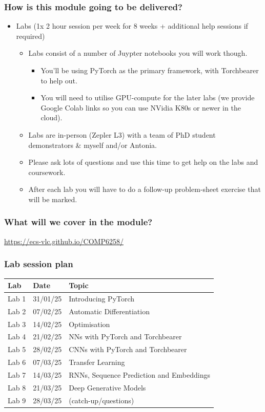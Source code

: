 \documentclass[]{article}
\begin{document}
\begin{frame}
	\frametitle{How is this module going to be delivered?}

	\begin{itemize}
		\item<+-> Labs (1x 2 hour session per week for 8 weeks + additional help sessions if required)
		\begin{itemize}
			\item Labs consist of a number of Juypter notebooks you will work though.
			\begin{itemize}
				\item You'll be using PyTorch as the primary framework, with Torchbearer to help out.
				\item You will need to utilise GPU-compute for the later labs (we provide Google Colab links so you can use NVidia K80s or newer in the cloud).
			\end{itemize}
			\item Labs are in-person (Zepler L3) with a team of PhD student demonstrators \& myself and/or Antonia.
			\item Please ask lots of questions and use this time to get help on the labs and coursework.
			\item After each lab you will have to do a follow-up problem-sheet exercise that will be marked.
		\end{itemize}
	\end{itemize}
\end{frame}

\begin{frame}
	\frametitle{What will we cover in the module?}
	\url{https://ecs-vlc.github.io/COMP6258/}
\end{frame}

\begin{frame}
	\frametitle{Lab session plan}

	\begin{center}
	\begin{tabular}{ l l l }
		 Lab & Date & Topic \\ \hline
		 Lab 1  & 31/01/25 & Introducing PyTorch \\
		 Lab 2  & 07/02/25 & Automatic Differentiation \\
		 Lab 3  & 14/02/25 & Optimisation \\
		 Lab 4  & 21/02/25 & NNs with PyTorch and Torchbearer \\
 		 Lab 5  & 28/02/25 & CNNs with PyTorch and Torchbearer \\
 		 Lab 6  & 07/03/25 & Transfer Learning \\
 		 Lab 7  & 14/03/25 & RNNs, Sequence Prediction and Embeddings \\
     Lab 8  & 21/03/25 & Deep Generative Models\\
     Lab 9  & 28/03/25 & (catch-up/questions)\\
	\end{tabular}
	\end{center}
\end{frame}
\end{document}

